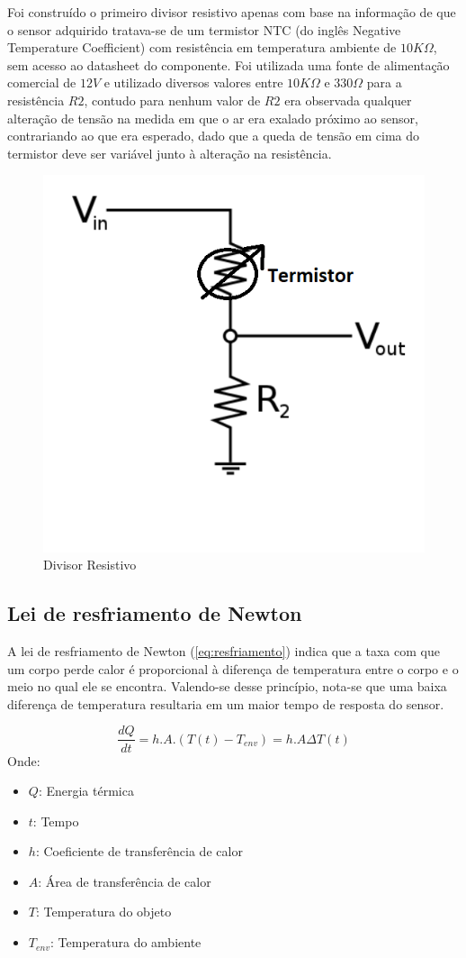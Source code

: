 Foi construído o primeiro divisor resistivo apenas com base na informação de que o sensor adquirido tratava-se de um termistor NTC (do inglês Negative Temperature Coefficient) com resistência em temperatura ambiente de $10K\Omega$, sem acesso ao datasheet do componente. Foi utilizada uma fonte de alimentação comercial de $12V$ e utilizado diversos valores entre $10K\Omega$ e $330\Omega$ para a resistência $R2$, contudo para nenhum valor de $R2$ era observada qualquer alteração de tensão na medida em que o ar era exalado próximo ao sensor, contrariando ao que era esperado, dado que a queda de tensão em cima do termistor deve ser variável junto à alteração na resistência.
 
\begin{figure}[h!]
	\begin{center}
 		\includegraphics[width=0.5\linewidth]{images/divisor_resistivo.png}
 		\caption{Divisor Resistivo}
 		\label{fig:divisorResistivo}
 	\end{center}
\end{figure}
 
\subsection{Lei de resfriamento de Newton} \label{sec:lei_de_resfriamento}
 
A lei de resfriamento de Newton (\ref{eq:resfriamento}) indica que a taxa com que um corpo perde calor é proporcional à diferença de temperatura entre o corpo e o meio  no qual ele se encontra. Valendo-se desse princípio, nota-se que uma baixa diferença de temperatura resultaria em um maior tempo de resposta do sensor. 
 
  
\begin{equation} \label{eq:resfriamento}
	\dfrac{dQ}{dt} = h.A.(T(t) - T_{env}) = h.A \Delta T(t)	
\end{equation}
Onde:
\begin{itemize}[label=]
	\item $Q$: Energia térmica
	\item $t$: Tempo
	\item $h$: Coeficiente de transferência de calor
	\item $A$: Área de transferência de calor
	\item $T$: Temperatura do objeto
	\item $T_{env}$: Temperatura do ambiente
\end{itemize}
 
